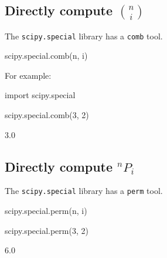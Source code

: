 \subsection{Directly compute \({n \choose i}\)}
\label{\detokenize{tools-for-mathematics/05-combinations-permutations/how/main:directly-computing-n-choose-i}}

The \texttt{scipy.special} library has a \texttt{comb} tool.


\begin{pyin}
scipy.special.comb(n, i)
\end{pyin}



For example:




\begin{pyin}
import scipy.special

scipy.special.comb(3, 2)
\end{pyin}





\begin{raw}
3.0
\end{raw}





\subsection{Directly compute \(^n P_i\)}
\label{\detokenize{tools-for-mathematics/05-combinations-permutations/how/main:directly-computing-n-p-i}}

The \texttt{scipy.special} library has a \texttt{perm} tool.


\begin{pyin}
scipy.special.perm(n, i)
\end{pyin}





\begin{pyin}
scipy.special.perm(3, 2)
\end{pyin}





\begin{raw}
6.0
\end{raw}







